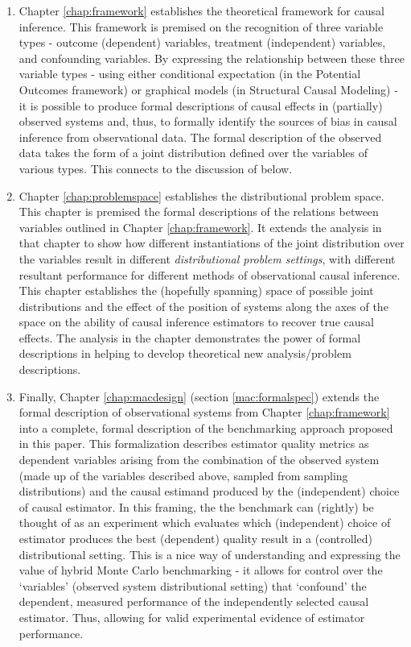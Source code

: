 \documentclass[./main.tex]{subfiles}
\begin{document}
\begin{enumerate}
    \item Chapter \ref{chap:framework} establishes the theoretical framework for causal inference. This framework is premised on the recognition of three variable types - outcome (dependent) variables, treatment (independent) variables, and confounding variables. By expressing the relationship between these three variable types - using either conditional expectation (in the Potential Outcomes framework) or graphical models (in Structural Causal Modeling) - it is possible to produce formal descriptions of causal effects in (partially) observed systems and, thus, to formally identify the sources of bias in causal inference from observational data. The formal description of the observed data takes the form of a joint distribution defined over the variables of various types. This connects to the discussion of  below.
    
    \item Chapter \ref{chap:problemspace} establishes the distributional problem space. This chapter is premised the formal descriptions of the relations between variables outlined in Chapter \ref{chap:framework}. It extends the analysis in that chapter to show how different instantiations of the joint distribution over the variables result in different \textit{distributional problem settings}, with different resultant performance for different methods of observational causal inference. This chapter establishes the (hopefully spanning) space of possible joint distributions and the effect of the position of systems along the axes of the space on the ability of causal inference estimators to recover true causal effects. The analysis in the chapter demonstrates the power of formal descriptions in helping to develop theoretical new analysis/problem descriptions.
    
    \item Finally, Chapter \ref{chap:macdesign} (section \ref{mac:formalspec}) extends the formal description of observational systems from Chapter \ref{chap:framework} into a complete, formal description of the benchmarking approach proposed in this paper. This formalization describes estimator quality metrics as dependent variables arising from the combination of the observed system (made up of the variables described above, sampled from sampling distributions) and the causal estimand produced by the (independent) choice of causal estimator. In this framing, the the benchmark can (rightly) be thought of as an experiment which evaluates which (independent) choice of estimator produces the best (dependent) quality result in a (controlled) distributional setting. This is a nice way of understanding and expressing the value of hybrid Monte Carlo benchmarking - it allows for control over the `variables' (observed system distributional setting) that `confound' the dependent, measured performance of the independently selected causal estimator. Thus, allowing for valid experimental evidence of estimator performance.
    
\end{enumerate}
\end{document}
